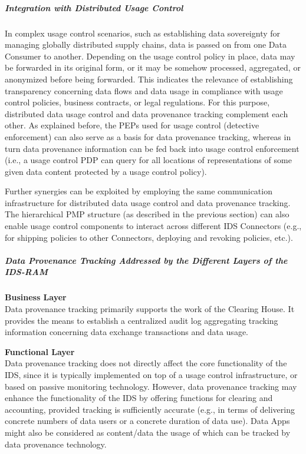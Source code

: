 \subparagraph*{Integration with Distributed Usage Control\\}
In complex usage control scenarios, such as establishing data sovereignty for managing globally distributed supply chains, data is passed on from one Data Consumer to another. Depending on the usage control policy in place, data may be forwarded in its original form, or it may be somehow processed, aggregated, or anonymized before being forwarded. This indicates the relevance of establishing transparency concerning data flows and data usage in compliance with usage control policies, business contracts, or legal regulations. For this purpose, distributed data usage control and data provenance tracking complement each other. As explained before, the PEPs used for usage control (detective enforcement) can also serve as a basis for data provenance tracking, whereas in turn data provenance information can be fed back into usage control enforcement (i.e., a usage control PDP can query for all locations of representations of some given data content protected by a usage control policy).

Further synergies can be exploited by employing the same communication infrastructure for distributed data usage control and data provenance tracking. The hierarchical PMP structure (as described in the previous section) can also enable usage control components to interact across different IDS Connectors (e.g., for shipping policies to other Connectors, deploying and revoking policies, etc.).

\subparagraph*{Data Provenance Tracking Addressed by the Different Layers of the IDS-RAM\\}
\textbf{Business Layer}\\
Data provenance tracking primarily supports the work of the Clearing House. It provides the means to establish a centralized audit log aggregating tracking information concerning data exchange transactions and data usage.

\textbf{Functional Layer}\\
Data provenance tracking does not directly affect the core functionality of the IDS, since it is typically implemented on top of a usage control infrastructure, or based on passive monitoring technology. However, data provenance tracking may enhance the functionality of the IDS by offering functions for clearing and accounting, provided tracking is sufficiently accurate (e.g., in terms of delivering concrete numbers of data users or a concrete duration of data use). Data Apps might also be considered as content/data the usage of which can be tracked by data provenance technology.

